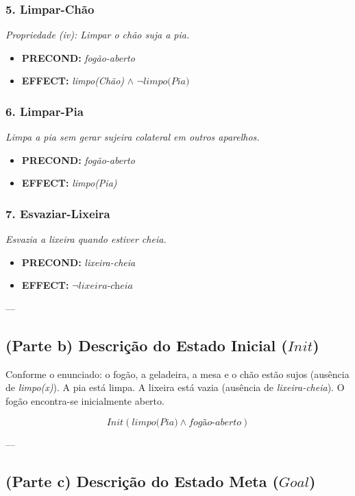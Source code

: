 \documentclass[a4paper,12pt]{article}
\begin{document}
\subsubsection*{5. Limpar-Chão}
\textit{Propriedade (iv): Limpar o chão suja a pia.}
\begin{itemize}
	\item \textbf{PRECOND:} \textit{fogão-aberto}
	\item \textbf{EFFECT:} \textit{limpo(Chão)} $\wedge$ $\neg \textit{limpo(Pia)}$
\end{itemize}

\subsubsection*{6. Limpar-Pia}
\textit{Limpa a pia sem gerar sujeira colateral em outros aparelhos.}
\begin{itemize}
	\item \textbf{PRECOND:} \textit{fogão-aberto}
	\item \textbf{EFFECT:} \textit{limpo(Pia)}
\end{itemize}

\subsubsection*{7. Esvaziar-Lixeira}
\textit{Esvazia a lixeira quando estiver cheia.}
\begin{itemize}
	\item \textbf{PRECOND:} \textit{lixeira-cheia}
	\item \textbf{EFFECT:} $\neg \textit{lixeira-cheia}$
\end{itemize}

---

\subsection*{(Parte b) Descrição do Estado Inicial ($Init$)}

Conforme o enunciado: o fogão, a geladeira, a mesa e o chão estão sujos (ausência de \textit{limpo(x)}). A pia está limpa. A lixeira está vazia (ausência de \textit{lixeira-cheia}). O fogão encontra-se inicialmente aberto.

\begin{equation}
	Init(\textit{limpo(Pia)} \wedge \textit{fogão-aberto})
\end{equation}

---

\subsection*{(Parte c) Descrição do Estado Meta ($Goal$)}
\end{document}
